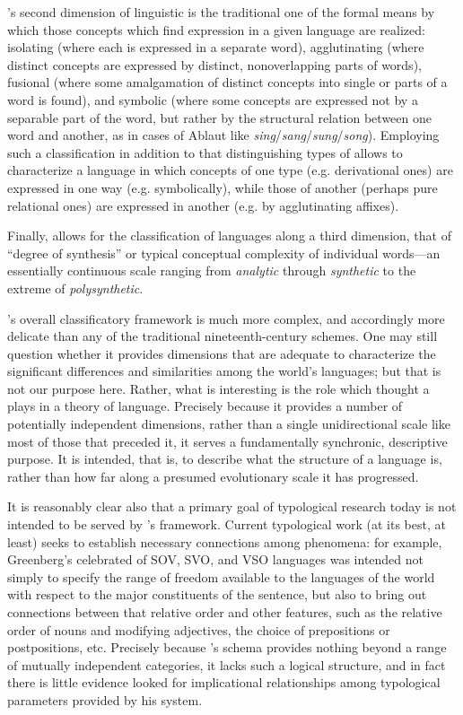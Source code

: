 {\Sapir}'s second dimension of linguistic  is the traditional one
of the formal means by which those concepts which find expression in a
given language are realized: isolating (where each  is
expressed in a separate word), agglutinating (where distinct concepts
are expressed by distinct, nonoverlapping parts of words), fusional
(where some amalgamation of distinct concepts into single or
 parts of a word is found), and symbolic (where some
concepts are expressed not by a separable part of the word, but rather
by the structural relation between one word and another, as in cases
of Ablaut like
\emph{sing}/\emph{sang}/\emph{sung}/\emph{song}). Employing such a
classification in addition to that distinguishing types of 
allows {\Sapir} to characterize a language in which concepts of one type
(e.g. derivational ones) are expressed in one way (e.g. symbolically),
while those of another (perhaps pure relational ones) are expressed in
another (e.g. by agglutinating affixes). 

Finally, {\Sapir} allows for the
classification of languages along a third dimension, that of ``degree
of synthesis'' or typical conceptual complexity of individual words—an
essentially continuous scale ranging from \emph{analytic} through
\emph{synthetic} to the extreme of \emph{polysynthetic}.

{\Sapir}'s overall classificatory framework is much more complex, and
accordingly more delicate than any of the traditional
nineteenth-century schemes. One may still question whether it provides
dimensions that are adequate to characterize the significant
differences and similarities among the world's languages; but that is
not our purpose here. Rather, what is interesting is the role which
{\Sapir} thought a  plays in a theory of language. Precisely
because it provides a number of potentially independent dimensions,
rather than a single unidirectional scale like most of those that
preceded it, it serves a fundamentally synchronic, descriptive
purpose. It is intended, that is, to describe what the structure of a
language is, rather than how far along a presumed evolutionary scale
it has progressed.

It is reasonably clear also that a primary goal of typological
research today is not intended to be served by {\Sapir}'s
framework. Current typological work (at its best, at least) seeks to
establish necessary connections among phenomena: for example,
Greenberg's celebrated  of SOV, SVO, and VSO languages was
intended not simply to specify the range of freedom available to the
languages of the world with respect to the major constituents of the
sentence, but also to bring out connections between that relative
order and other features, such as the relative order of nouns and
modifying adjectives, the choice of prepositions or postpositions,
etc. Precisely because {\Sapir}'s schema provides nothing beyond a range
of mutually independent categories, it lacks such a logical structure,
and in fact there is little evidence {\Sapir} looked for implicational
relationships among typological parameters provided by his system.

